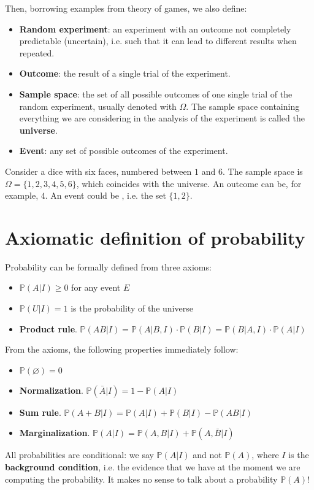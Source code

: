\documentclass[../template.tex]{subfiles}
\begin{document}
Then, borrowing examples from theory of games, we also define:
\begin{itemize}
    \item \textbf{Random experiment}: an experiment with an outcome not completely predictable (uncertain), i.e. such that it can lead to different results when repeated.
    \item \textbf{Outcome}: the result of a single trial of the experiment.
    \item \textbf{Sample space}: the set of all possible outcomes of one single trial of the random experiment, usually denoted with $\Omega$. The sample space containing everything we are considering in the analysis of the experiment is called the \textbf{universe}.    
    \item \textbf{Event}: any set of possible outcomes of the experiment. 
\end{itemize}

\begin{example}
    Consider a dice with six faces, numbered between $1$ and $6$. The sample space is $\Omega = \{1,2,3,4,5,6\}$, which coincides with the universe. An outcome can be, for example, $4$. An event could be , i.e. the set $\{1,2\}$.
\end{example}


\section{Axiomatic definition of probability}
Probability can be formally defined from three axioms:
\begin{itemize}
    \item $\mathbb{P}(A|I) \geq 0$ for any event $E$
    \item $\mathbb{P}(U|I) = 1$ is the probability of the universe
    \item \textbf{Product rule}. $\mathbb{P}(AB|I) = \mathbb{P}(A|B,I) \cdot \mathbb{P}(B|I) = \mathbb{P}(B|A,I) \cdot \mathbb{P}(A|I)$
\end{itemize}
From the axioms, the following properties immediately follow:
\begin{itemize}
    \item $\mathbb{P}(\varnothing) = 0$
    \item \textbf{Normalization}. $\mathbb{P}(\bar{A}|I) = 1- \mathbb{P}(A|I)$
    \item \textbf{Sum rule}. $\mathbb{P}(A+B|I) = \mathbb{P}(A|I) + \mathbb{P}(B|I) - \mathbb{P}(AB|I)$
    \item \textbf{Marginalization}. $\mathbb{P}(A|I) = \mathbb{P}(A,B|I) + \mathbb{P}(A,\bar{B}|I)$ 
\end{itemize}
All probabilities are conditional: we say $\mathbb{P}(A|I)$ and not $\mathbb{P}(A)$, where $I$ is the \textbf{background condition}, i.e. the evidence that we have at the moment we are computing the probability. It makes no sense to talk about a  probability $\mathbb{P}(A)$!
\end{document}
